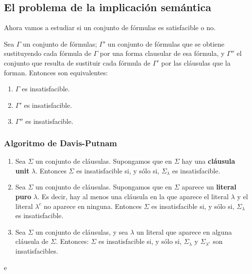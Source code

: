 \subsection{El problema de la implicación semántica}
Ahora vamos a estudiar si un conjunto de fórmulas es satisfacible o no.
\begin{nth}
    Sea $\Gamma$ un conjunto de fórmulas; $\Gamma'$ un conjunto de fórmulas que se obtiene sustituyendo cada fórmula de $\Gamma$ por una forma clausular de esa fórmula, y $\Gamma''$ el conjunto que resulta de sustituir cada fórmula de $\Gamma'$ por las cláusulas que la forman. Entonces son equivalentes:
    \begin{enumerate}
        \item $\Gamma$ es insatisfacible.
        \item $\Gamma'$ es insatisfacible.
        \item $\Gamma''$ es insatisfacible.
    \end{enumerate}
\end{nth}

\subsubsection{Algoritmo de Davis-Putnam}
\begin{enumerate}
    \item Sea $\Sigma$ un conjunto de cláusulas. Supongamos que en $\Sigma$ hay una \textbf{cláusula unit} $\lambda$. Entonces $\Sigma$ es insatisfacible si, y sólo si, $\Sigma_\lambda$ es insatisfacible.
    \item Sea $\Sigma$ un conjunto de cláusulas. Supongamos que en $\Sigma$ aparece un \textbf{literal puro} $\lambda$. Es decir, hay al menos una cláusula en la que aparece el literal $\lambda$ y el literal $\lambda^c$ no aparece en ninguna. Entonces $\Sigma$ es insatisfacible si, y sólo si, $\Sigma_\lambda$ es insatisfacible.
    \item Sea $\Sigma$ un conjunto de cláusulas, y sea $\lambda$ un literal que aparece en alguna cláusula de $\Sigma$. Entonces: $\Sigma$ es insatisfacible si, y sólo si, $\Sigma_\lambda$ y $\Sigma_{\lambda^c}$ son insatisfacibles.
\end{enumerate}
\begin{ejemplo}
    e
\end{ejemplo}

